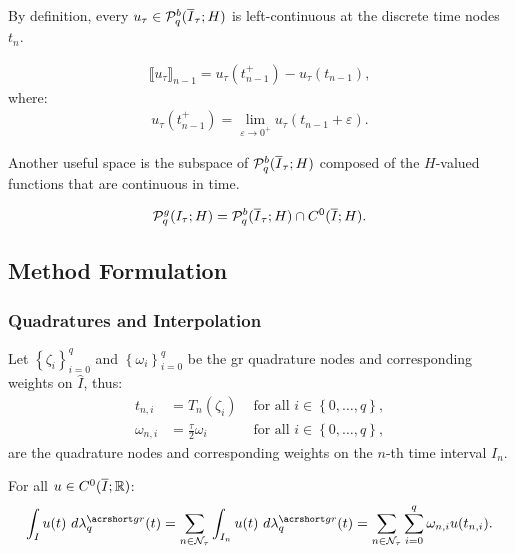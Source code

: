 By definition, every $u_{\tau} \in \mathcal{P}_{q}^b(\overline{I}_{\tau}; H)$ is left-continuous at the discrete time nodes $t_n$.

\begin{definition} \label{def:time_jumps}
    \begin{align}
        \llbracket u_{\tau} \rrbracket_{n - 1} = u_{\tau}(t_{n - 1}^+) - u_{\tau}(t_{n - 1}),
    \end{align}
    where:
    \begin{align}
        u_{\tau}(t_{n - 1}^+) = \lim_{\varepsilon \rightarrow 0^+} u_{\tau}(t_{n - 1} + \varepsilon).
    \end{align}
\end{definition}

Another useful space is the subspace of $\mathcal{P}_{q}^b(\overline{I}_{\tau}; H)$ composed of the $H$-valued functions that are continuous in time.

\begin{definition}
    \begin{align}
        \mathcal{P}_{q}^g(I_{\tau}; H) = \mathcal{P}_{q}^b(\overline{I}_{\tau}; H) \cap C^0(\overline{I}; H).
    \end{align}
\end{definition}

\newpage
\subsection{Method Formulation} \label{subsection:method_formulation}

\subsubsection{Quadratures and Interpolation}

Let $\left\{ \zeta_i \right\}_{i = 0}^{q}$ and $\left\{ \omega_i \right\}_{i = 0}^{q}$ be the \acrfull{gr} quadrature nodes and corresponding weights on $\hat{I}$, thus:
\begin{align}
    t_{n, i} &= T_n(\zeta_i) &\text{ for all } i \in \left\{ 0, \dots, q \right\}, \\
    \omega_{n, i} &= \frac{\tau}{2} \omega_i &\text{ for all } i \in \left\{ 0, \dots, q \right\},
\end{align}
are the quadrature nodes and corresponding weights on the $n$-th time interval $I_n$.

\begin{definition}[$\lambdaGR_q$]
    For all $u \in C^0(\overline{I}; \mathbb{R})$:
    \begin{align}
        \int_I u(t) ~ d \lambdaGR_q(t) = \sum_{n \in \TimeIndices} \int_{I_n} u(t) ~ d \lambdaGR_q(t) = \sum_{n \in \TimeIndices} \sum_{i = 0}^q \omega_{n, i} u(t_{n, i}).
    \end{align}
\end{definition}

